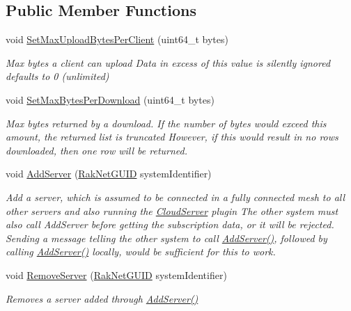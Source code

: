 \subsection*{Public Member Functions}
\begin{DoxyCompactItemize}
\item 
void \hyperlink{class_rak_net_1_1_cloud_server_a1bcb42cd6c7dae5d4378b1a715559d68}{Set\-Max\-Upload\-Bytes\-Per\-Client} (uint64\-\_\-t bytes)
\begin{DoxyCompactList}\small\item\em Max bytes a client can upload Data in excess of this value is silently ignored defaults to 0 (unlimited) \end{DoxyCompactList}\item 
void \hyperlink{class_rak_net_1_1_cloud_server_aa529f108ef92745242ede1fb84d429ca}{Set\-Max\-Bytes\-Per\-Download} (uint64\-\_\-t bytes)
\begin{DoxyCompactList}\small\item\em Max bytes returned by a download. If the number of bytes would exceed this amount, the returned list is truncated However, if this would result in no rows downloaded, then one row will be returned. \end{DoxyCompactList}\item 
void \hyperlink{class_rak_net_1_1_cloud_server_a841533f84b8e356be7437fb8e99466ba}{Add\-Server} (\hyperlink{struct_rak_net_1_1_rak_net_g_u_i_d}{Rak\-Net\-G\-U\-I\-D} system\-Identifier)
\begin{DoxyCompactList}\small\item\em Add a server, which is assumed to be connected in a fully connected mesh to all other servers and also running the \hyperlink{class_rak_net_1_1_cloud_server}{Cloud\-Server} plugin The other system must also call Add\-Server before getting the subscription data, or it will be rejected. Sending a message telling the other system to call \hyperlink{class_rak_net_1_1_cloud_server_a841533f84b8e356be7437fb8e99466ba}{Add\-Server()}, followed by calling \hyperlink{class_rak_net_1_1_cloud_server_a841533f84b8e356be7437fb8e99466ba}{Add\-Server()} locally, would be sufficient for this to work. \end{DoxyCompactList}\item 
void \hyperlink{class_rak_net_1_1_cloud_server_a47007061a4490ab5aa84fd47a289c9f0}{Remove\-Server} (\hyperlink{struct_rak_net_1_1_rak_net_g_u_i_d}{Rak\-Net\-G\-U\-I\-D} system\-Identifier)
\begin{DoxyCompactList}\small\item\em Removes a server added through \hyperlink{class_rak_net_1_1_cloud_server_a841533f84b8e356be7437fb8e99466ba}{Add\-Server()} \end{DoxyCompactList}\item 

\end{DoxyCompactItemize}

